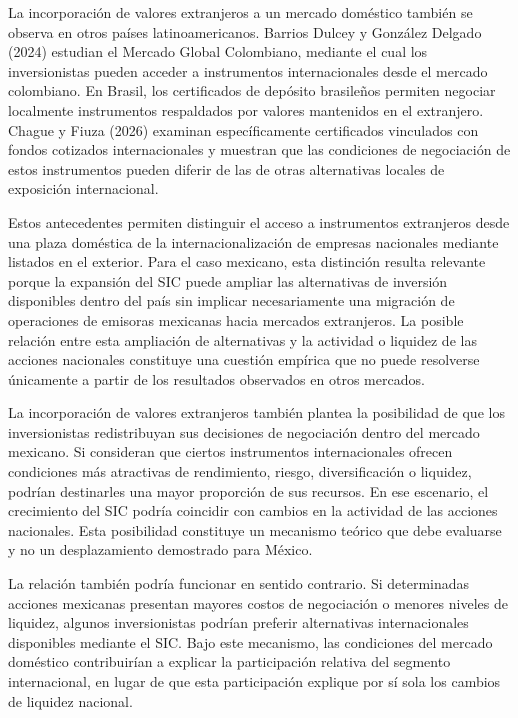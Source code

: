 La incorporación de valores extranjeros a un mercado doméstico también se observa en otros países latinoamericanos. Barrios Dulcey y González Delgado (2024) estudian el Mercado Global Colombiano, mediante el cual los inversionistas pueden acceder a instrumentos internacionales desde el mercado colombiano. En Brasil, los certificados de depósito brasileños permiten negociar localmente instrumentos respaldados por valores mantenidos en el extranjero. Chague y Fiuza (2026) examinan específicamente certificados vinculados con fondos cotizados internacionales y muestran que las condiciones de negociación de estos instrumentos pueden diferir de las de otras alternativas locales de exposición internacional.

Estos antecedentes permiten distinguir el acceso a instrumentos extranjeros desde una plaza doméstica de la internacionalización de empresas nacionales mediante listados en el exterior. Para el caso mexicano, esta distinción resulta relevante porque la expansión del SIC puede ampliar las alternativas de inversión disponibles dentro del país sin implicar necesariamente una migración de operaciones de emisoras mexicanas hacia mercados extranjeros. La posible relación entre esta ampliación de alternativas y la actividad o liquidez de las acciones nacionales constituye una cuestión empírica que no puede resolverse únicamente a partir de los resultados observados en otros mercados.

La incorporación de valores extranjeros también plantea la posibilidad de que los inversionistas redistribuyan sus decisiones de negociación dentro del mercado mexicano. Si consideran que ciertos instrumentos internacionales ofrecen condiciones más atractivas de rendimiento, riesgo, diversificación o liquidez, podrían destinarles una mayor proporción de sus recursos. En ese escenario, el crecimiento del SIC podría coincidir con cambios en la actividad de las acciones nacionales. Esta posibilidad constituye un mecanismo teórico que debe evaluarse y no un desplazamiento demostrado para México.

La relación también podría funcionar en sentido contrario. Si determinadas acciones mexicanas presentan mayores costos de negociación o menores niveles de liquidez, algunos inversionistas podrían preferir alternativas internacionales disponibles mediante el SIC. Bajo este mecanismo, las condiciones del mercado doméstico contribuirían a explicar la participación relativa del segmento internacional, en lugar de que esta participación explique por sí sola los cambios de liquidez nacional.


